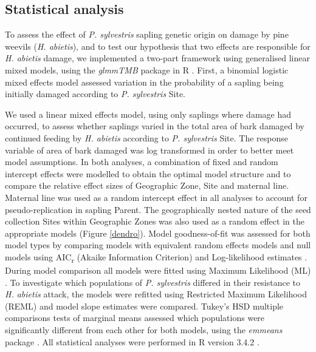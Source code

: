 \documentclass[a4paper, 11pt]{article}
\begin{document}

\subsection*{Statistical analysis}

To assess the effect of \textit{P. sylvestris} sapling genetic origin on damage by pine weevils (\textit{H. abietis}), and to test our hypothesis that two effects are responsible for \textit{H. abietis} damage, we implemented a two-part framework using generalised linear mixed models, using the \textit{glmmTMB} package in R \citep{glmmTMB}. First, a binomial logistic mixed effects model assessed variation in the probability of a sapling being initially damaged  according to \textit{P. sylvestris} Site.

We used a linear mixed effects model, using only saplings where damage had occurred, to assess whether saplings varied in the total area of bark damaged by continued feeding by \textit{H. abietis} according to \textit{P. sylvestris} Site. The response variable of area of bark damaged was log transformed in order to better meet model assumptions. In both analyses, a combination of fixed and random intercept effects were modelled to obtain the optimal model structure and to compare the relative effect sizes of Geographic Zone, Site and maternal line. Maternal line was used as a random intercept effect in all analyses to account for pseudo-replication in sapling Parent. The geographically nested nature of the seed collection Sites within Geographic Zones was also used as a random effect in the appropriate models (Figure \ref{dendro}). Model goodness-of-fit was assessed for both model types by comparing models with equivalent random effects models and null models using AIC\textsubscript{r} (Akaike Information Criterion) and Log-likelihood estimates \citep{Bolker2008}. During model comparison all models were fitted using Maximum Likelihood (ML) \citep{Bolker2008}. To investigate which populations of \textit{P. sylvestris} differed in their resistance to \textit{H. abietis} attack, the models were refitted using Restricted Maximum Likelihood (REML) and model slope estimates were compared. Tukey's HSD multiple comparisons tests of marginal means assessed which populations were significantly different from each other for both models, using the \textit{emmeans} package \citep{Russell2019}. All statistical analyses were performed in R version 3.4.2 \citep{RCoreTeam2019}. 
\end{document}
